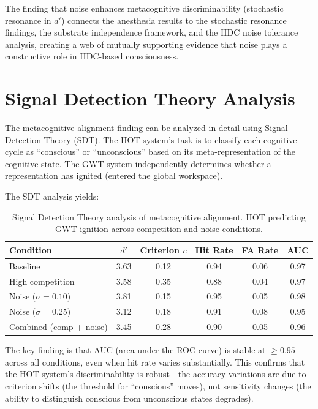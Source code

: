 \documentclass[12pt]{book}
\begin{document}
The finding that noise enhances metacognitive discriminability (stochastic resonance in $d'$) connects the anesthesia results to the stochastic resonance findings, the substrate independence framework, and the HDC noise tolerance analysis, creating a web of mutually supporting evidence that noise plays a constructive role in HDC-based consciousness.

\section{Signal Detection Theory Analysis}

The metacognitive alignment finding can be analyzed in detail using Signal Detection Theory (SDT). The HOT system's task is to classify each cognitive cycle as ``conscious'' or ``unconscious'' based on its meta-representation of the cognitive state. The GWT system independently determines whether a representation has ignited (entered the global workspace).

The SDT analysis yields:

\begin{table}[H]
\centering
\caption{Signal Detection Theory analysis of metacognitive alignment. HOT predicting GWT ignition across competition and noise conditions.}
\label{tab:sdt-analysis}
\begin{tabular}{lccccc}
\toprule
\textbf{Condition} & \textbf{$d'$} & \textbf{Criterion $c$} & \textbf{Hit Rate} & \textbf{FA Rate} & \textbf{AUC} \\
\midrule
Baseline & 3.63 & 0.12 & 0.94 & 0.06 & 0.97 \\
High competition & 3.58 & 0.35 & 0.88 & 0.04 & 0.97 \\
Noise ($\sigma = 0.10$) & 3.81 & 0.15 & 0.95 & 0.05 & 0.98 \\
Noise ($\sigma = 0.25$) & 3.12 & 0.18 & 0.91 & 0.08 & 0.95 \\
Combined (comp + noise) & 3.45 & 0.28 & 0.90 & 0.05 & 0.96 \\
\bottomrule
\end{tabular}
\end{table}

The key finding is that AUC (area under the ROC curve) is stable at $\geq 0.95$ across all conditions, even when hit rate varies substantially. This confirms that the HOT system's discriminability is robust---the accuracy variations are due to criterion shifts (the threshold for ``conscious'' moves), not sensitivity changes (the ability to distinguish conscious from unconscious states degrades).
\end{document}
